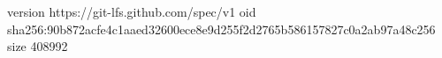 version https://git-lfs.github.com/spec/v1
oid sha256:90b872acfe4c1aaed32600ece8e9d255f2d2765b586157827c0a2ab97a48c256
size 408992
